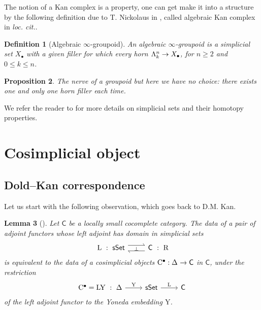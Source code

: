 \documentclass[twoside, 10pt]{amsart}
\newtheorem{lemma}{Lemma}[section]
\newtheorem{definition}[lemma]{Definition}
\newtheorem{proposition}[lemma]{Proposition}
\begin{document}
The notion of a Kan complex is a property, one can get make it into a structure by the following definition due to T. Nickolaus in \cite{Nickolaus11}, called algebraic Kan complex in \textit{loc. cit.}. 

\begin{definition}[Algebraic $\infty$-groupoid]
An \emph{algebraic $\infty$-groupoid} is a simplicial set $X_\bullet$ with a given filler for which every horn $\Ho{k}{n}\to X_\bullet$, for $n\geqslant 2$ and $0\leqslant k \leqslant n$.
\end{definition}

\begin{proposition}
The nerve of a groupoid but here we have no choice: there exists one and only one horn filler each time. 
\end{proposition}


We refer the reader to \cite{GoerssJardine09} for more details on simplicial sets and their homotopy properties. 
\section{Cosimplicial object \bruno{[Bruno]}}

\subsection{Dold--Kan correspondence}

Let us start with the following observation, which  goes back to D.M. Kan. 

\begin{lemma}[{\cite{Kan58bis}}]\label{lem:AdjCosimpliObj}
Let $\mathsf{C}$ be a locally small cocomplete category. 
The data of a pair of adjoint functors whose left adjoint has domain in simplicial sets 
\[ 
\vcenter{\hbox{
\begin{tikzcd}
{\ \ \mathrm{L} \ : \ \sSe}
\arrow[r, harpoon, shift left=0.9ex, "\perp"']
&
\arrow[l, harpoon,  shift left=0.9ex]
\mathsf{C}\ : \ \mathrm{R}\ 
\end{tikzcd}
}}
\]
is equivalent to the data of a cosimplicial objects
$\mathrm{C}^\bullet : \De{} \to \mathsf{C}$
 in $\mathsf{C}$, under the restriction 
\[
\vcenter{\hbox{
\begin{tikzcd}
\mathrm{C}^\bullet=\mathrm{L}\mathrm{Y}\ : \ \cD
\arrow[r, "\mathrm{Y}"]
&
\sSe \arrow[r, "\mathrm{L}"]
&
\mathsf{C}
\end{tikzcd}
}}
\]
of the left adjoint functor to  the Yoneda embedding $\mathrm{Y}$. 
\end{lemma}
\end{document}
